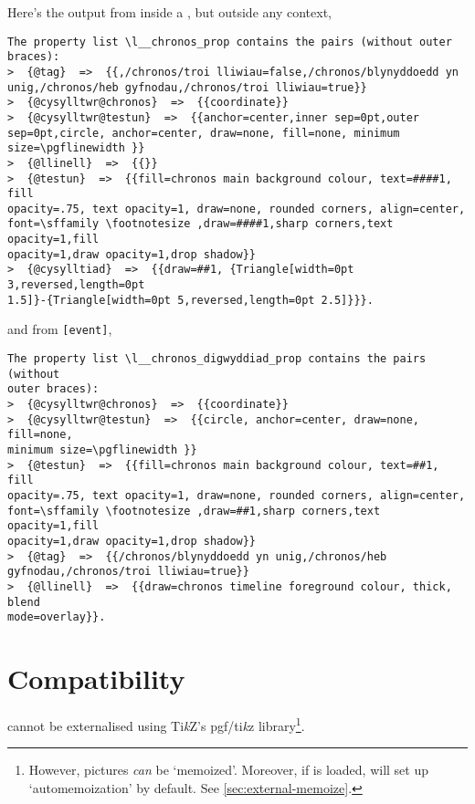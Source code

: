 \documentclass[10pt,british,a4paper]{ltxdoc}
\makeatletter
\newcommand*\pkg[1]{\textpkg{#1}}
\newcommand*\Pkg[1]{\textpkg{\MakeUppercase#1}}
\newcommand*\lib[1]{\textpkg{#1}}%
\newcommand*\liblabelname{pgf/ti\string\emph{k}z library}
\newcommand*\TikZ{Ti\emph{k}Z}
\makeatother
\begin{document}
Here's the output from  inside a  \envlabelname{}, but outside any \taglabelname{} context,
\begin{verbatim}
The property list \l__chronos_prop contains the pairs (without outer braces):
>  {@tag}  =>  {{,/chronos/troi lliwiau=false,/chronos/blynyddoedd yn
unig,/chronos/heb gyfnodau,/chronos/troi lliwiau=true}}
>  {@cysylltwr@chronos}  =>  {{coordinate}}
>  {@cysylltwr@testun}  =>  {{anchor=center,inner sep=0pt,outer
sep=0pt,circle, anchor=center, draw=none, fill=none, minimum
size=\pgflinewidth }}
>  {@llinell}  =>  {{}}
>  {@testun}  =>  {{fill=chronos main background colour, text=####1, fill
opacity=.75, text opacity=1, draw=none, rounded corners, align=center,
font=\sffamily \footnotesize ,draw=####1,sharp corners,text opacity=1,fill
opacity=1,draw opacity=1,drop shadow}}
>  {@cysylltiad}  =>  {{draw=##1, {Triangle[width=0pt 3,reversed,length=0pt
1.5]}-{Triangle[width=0pt 5,reversed,length=0pt 2.5]}}}.
\end{verbatim}
and from \texttt{[event]},
\begin{verbatim}
The property list \l__chronos_digwyddiad_prop contains the pairs (without
outer braces):
>  {@cysylltwr@chronos}  =>  {{coordinate}}
>  {@cysylltwr@testun}  =>  {{circle, anchor=center, draw=none, fill=none,
minimum size=\pgflinewidth }}
>  {@testun}  =>  {{fill=chronos main background colour, text=##1, fill
opacity=.75, text opacity=1, draw=none, rounded corners, align=center,
font=\sffamily \footnotesize ,draw=##1,sharp corners,text opacity=1,fill
opacity=1,draw opacity=1,drop shadow}}
>  {@tag}  =>  {{/chronos/blynyddoedd yn unig,/chronos/heb
gyfnodau,/chronos/troi lliwiau=true}}
>  {@llinell}  =>  {{draw=chronos timeline foreground colour, thick, blend
mode=overlay}}.
\end{verbatim}




\clearpage

%
\fancyheadoffset[lh]{0pt}%

\section{Compatibility}\label{sec:compat}

\Pkg{chronos}  cannot be externalised using \TikZ{}'s \lib{external} \liblabelname{}\footnote{%
  However, \pkg{chronos} pictures \emph{can} be ‘memoized’.
  Moreover, if  is loaded, \pkg{chronos} will set up ‘automemoization’ by default.
  See \cref{sec:external-memoize}.}.
\end{document}
